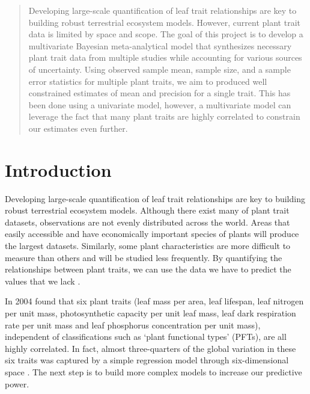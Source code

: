 \documentclass[12pt,fleqn]{article}
\begin{document}
\author{Betsy Cowdery}
\title{}
\date{December 12, 2014}

\maketitle


\begin{abstract}

Developing large-scale quantification of leaf trait relationships are key to building robust terrestrial ecosystem models. However, current plant trait data is limited by space and scope. The  goal of this project is to develop a multivariate Bayesian meta-analytical model that synthesizes necessary plant trait data from multiple studies while accounting for various sources of uncertainty. Using observed sample mean, sample size, and a sample error statistics for multiple plant traits, we aim to produced well constrained estimates of mean and precision for a single trait. This has been done using a univariate model, however, a multivariate model can leverage the fact that many plant traits are highly correlated to constrain our estimates even further.  

\end{abstract}


\newpage
\linenumbers
\section{Introduction}

Developing large-scale quantification of leaf trait relationships are key to building robust terrestrial ecosystem models. Although there exist many of plant trait datasets, observations are not evenly distributed across the world. Areas that easily accessible and have economically important species of plants will produce the largest datasets. Similarly, some plant characteristics are more difficult to measure than others and will be studied less frequently. By quantifying the relationships between plant traits, we can use the data we have to predict the values that we lack \citep{Wright,Reich2007}. 

In 2004 \citep{Wright} found that six plant traits (leaf mass per area, leaf lifespan, leaf nitrogen per unit mass, photosynthetic capacity per unit leaf mass, leaf dark respiration rate per unit mass  and leaf phosphorus concentration per unit mass), independent of classifications such as ‘plant functional types’ (PFTs), are all highly correlated. In fact, almost three-quarters of the global variation in these six traits was captured by a simple regression model through six-dimensional space \citep{Wright2005}. The next step is to build more complex models to increase our predictive power. 
\end{document}

